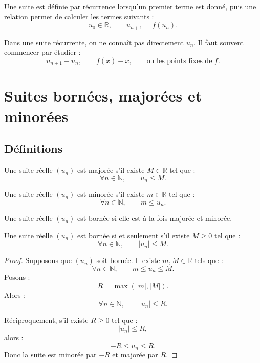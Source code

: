 \documentclass[11pt,a4paper]{article}
\newcommand{\N}{\mathbb N}
\newcommand{\R}{\mathbb R}
\newcommand{\abs}[1]{\left|#1\right|}
\begin{document}
\begin{definitionbox}
Une suite est définie par récurrence lorsqu'un premier terme est donné, puis une relation permet de calculer les termes suivants :
\[
u_0\in\R,\qquad u_{n+1}=f(u_n).
\]
\end{definitionbox}

\begin{erreurbox}
Dans une suite récurrente, on ne connaît pas directement \(u_n\).  
Il faut souvent commencer par étudier :
\[
u_{n+1}-u_n,\qquad f(x)-x,\qquad \text{ou les points fixes de }f.
\]
\end{erreurbox}

\section{Suites bornées, majorées et minorées}

\subsection{Définitions}

\begin{definitionbox}
Une suite réelle \((u_n)\) est majorée s'il existe \(M\in\R\) tel que :
\[
\forall n\in\N,\qquad u_n\leq M.
\]
\end{definitionbox}

\begin{definitionbox}
Une suite réelle \((u_n)\) est minorée s'il existe \(m\in\R\) tel que :
\[
\forall n\in\N,\qquad m\leq u_n.
\]
\end{definitionbox}

\begin{definitionbox}
Une suite réelle \((u_n)\) est bornée si elle est à la fois majorée et minorée.
\end{definitionbox}

\begin{theorembox}
Une suite réelle \((u_n)\) est bornée si et seulement s'il existe \(M\geq0\) tel que :
\[
\forall n\in\N,\qquad \abs{u_n}\leq M.
\]
\end{theorembox}

\begin{proof}
Supposons que \((u_n)\) soit bornée.  
Il existe \(m,M\in\R\) tels que :
\[
\forall n\in\N,\qquad m\leq u_n\leq M.
\]
Posons :
\[
R=\max(\abs{m},\abs{M}).
\]
Alors :
\[
\forall n\in\N,\qquad \abs{u_n}\leq R.
\]

Réciproquement, s'il existe \(R\geq0\) tel que :
\[
\abs{u_n}\leq R,
\]
alors :
\[
-R\leq u_n\leq R.
\]
Donc la suite est minorée par \(-R\) et majorée par \(R\).
\end{proof}
\end{document}
